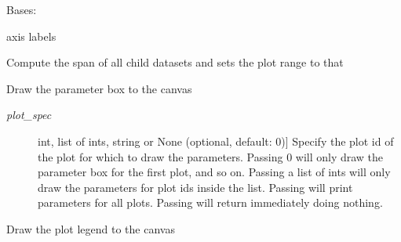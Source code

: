 \documentclass[a4paper,10pt,english]{sphinxmanual}
\begin{document}
\begin{fulllineitems}
\label{index:kafe.plot.Plot}
Bases: 

\begin{fulllineitems}
\label{index:kafe.plot.Plot.axis_labels}
axis labels

\end{fulllineitems}


\begin{fulllineitems}
\label{index:kafe.plot.Plot.compute_plot_range}
Compute the span of all child datasets and sets the plot range to that

\end{fulllineitems}


\begin{fulllineitems}
\label{index:kafe.plot.Plot.draw_fit_parameters_box}
Draw the parameter box to the canvas
\begin{description}
\item[{\emph{plot\_spec}}] \leavevmode{[}int, list of ints, string or None (optional, default: 0){]}
Specify the plot id of the plot for which to draw the parameters.
Passing 0 will only draw the parameter box for the first plot, and
so on. Passing a list of ints will only draw the parameters for
plot ids inside the list. Passing  will print parameters
for all plots. Passing  will return immediately doing
nothing.

\end{description}

\end{fulllineitems}


\begin{fulllineitems}
\label{index:kafe.plot.Plot.draw_legend}
Draw the plot legend to the canvas

\end{fulllineitems}


\end{fulllineitems}
\end{document}
